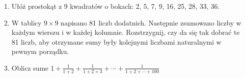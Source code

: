 \documentclass[10pt]{article}
\begin{document}
\begin{enumerate}
  \item Ułóż prostokąt z 9 kwadratów o bokach: 2, 5, 7, 9, 16, 25, 28, 33, 36.
  \item W tablicy \(9 \times 9\) napisano 81 liczb dodatnich. Następnie zsumowano liczby w każdym wierszu i w każdej kolumnie. Rozstrzygnij, czy da się tak dobrać te 81 liczb, aby otrzymane sumy były kolejnymi liczbami naturalnymi w pewnym porządku.
  \item Oblicz sume \(1+\frac{1}{1+2}+\frac{1}{1+2+3}+\cdots+\frac{1}{1+2+\cdots+100}\)
\end{enumerate}
\end{document}
